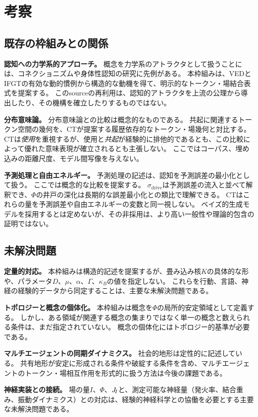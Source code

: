 \section{考察}
\label{sec:discussion}

\subsection{既存の枠組みとの関係}
\textbf{認知への力学系的アプローチ。}
概念を力学系のアトラクタとして扱うことには、コネクショニズムや身体性認知の研究に先例がある\citep[e.g.,][]{thelen1994dynamic}。
本枠組みは、VEDとIFGTの有効な動的慣例から構造的な動機を得て、明示的なトークン・場結合表式を提案する。
このsourceの再利用は、認知的アトラクタを上流の公理から導出したり、その機構を確立したりするものではない。

\textbf{分布意味論。}
分布意味論との比較は概念的なものである。
共起に関連するトークン空間の幾何を、CTが提案する履歴依存的なトークン・場幾何と対比する。
CTは\emph{使用}を重視するが、使用と\emph{共起}が経験的に排他的であるとも、この比較によって優れた意味表現が確立されるとも主張しない。
ここではコーパス、埋め込みの距離尺度、モデル間写像を与えない。

\textbf{予測処理と自由エネルギー。}
予測処理の記述は、認知を予測誤差の最小化として扱う\citep{friston2010free}。
ここでは概念的な比較を提案する。
$\sigma_{\mathrm{drive}}$は予測誤差の流入と並べて解釈でき、$\Phi$の井戸の深化は長期的な誤差最小化との類比で理解できる。
CTはこれらの量を予測誤差や自由エネルギーの変数と同一視しない。
ベイズ的生成モデルを採用するとは定めないが、その非採用は、より高い一般性や理論的包含の証明ではない。

\subsection{未解決問題}
\textbf{定量的対応。}
本枠組みは構造的記述を提案するが、畳み込み核$K$の具体的な形や、パラメータ$D$、$\mu$、$\alpha$、$\Gamma$、$\kappa_B$の値を指定しない。
これらを行動、言語、神経の経験的データから同定することは、主要な未解決問題である。

\textbf{トポロジーと概念の個体化。}
本枠組みは概念を$\Phi$の局所的安定領域として定義する。
しかし、ある領域が関連する概念の集まりではなく単一の概念と数えられる条件は、まだ指定されていない。
概念の個体化にはトポロジー的基準が必要である。

\textbf{マルチエージェントの同期ダイナミクス。}
社会的地形は定性的に記述している。
共有地形が安定に形成される条件や破綻する条件を含め、マルチエージェントのトークン・場相互作用を形式的に扱う方法は今後の課題である。

\textbf{神経実装との接続。}
場の量$I$、$\Phi$、$J_{\!I}$と、測定可能な神経量（発火率、結合重み、振動ダイナミクス）との対応は、経験的神経科学との協働を必要とする主要な未解決問題である。
